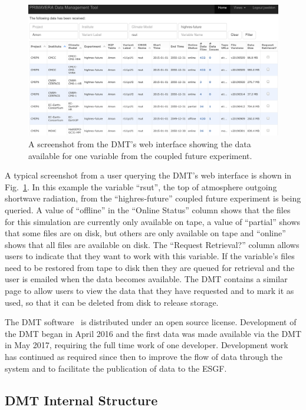 \documentclass[gmd, manuscript]{copernicus}
\begin{document}
\begin{figure}[ht]
	\includegraphics[width=12cm]{fig03.png}
	\caption{A screenshot from the DMT's web interface showing the data available for one variable from the coupled future experiment.}
	\label{dmt_query}
\end{figure}

A typical screenshot from a user querying the DMT's web interface is shown in Fig.~\ref{dmt_query}. In this example the variable ``rsut'', the top of atmosphere outgoing shortwave radiation, from the ``highres-future'' coupled future experiment is being queried. A value of ``offline'' in the ``Online Status'' column shows that the files for this simulation are currently only available on tape, a value of ``partial'' shows that some files are on disk, but others are only available on tape and ``online'' shows that all files are available on disk. The ``Request Retrieval?'' column allows users to indicate that they want to work with this variable. If the variable's files need to be restored from tape to disk then they are queued for retrieval and the user is emailed when the data becomes available. The DMT contains a similar page to allow users to view the data that they have requested and to mark it as used, so that it can be deleted from disk to release storage.

The DMT software~\citep{Seddon2019} is distributed under an open source license. Development of the DMT began in April 2016 and the first data was made available via the DMT in May 2017, requiring the full time work of one developer. Development work has continued as required since then to improve the flow of data through the system and to facilitate the publication of data to the ESGF. 

\subsection{DMT Internal Structure}
\end{document}
